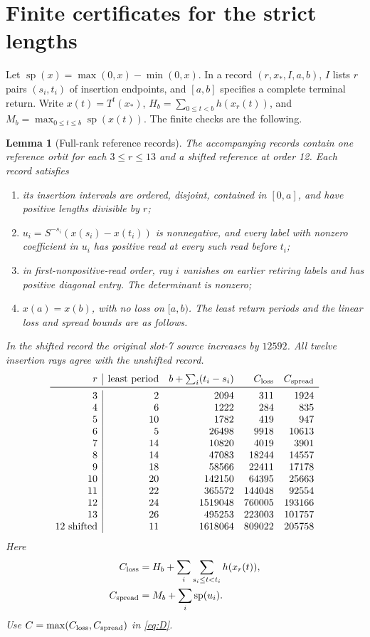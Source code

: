 \documentclass[11pt,reqno]{amsart}
\newtheorem{lemma}[theorem]{Lemma}
\theoremstyle{remark}
\begin{document}
\section{Finite certificates for the strict lengths}\label{app:strict}

Let \(\operatorname{sp}(x)=\max(0,x)-\min(0,x)\).
In a record \((r,x_*,I,a,b)\), \(I\) lists \(r\) pairs
\((s_i,t_i)\) of insertion endpoints, and \([a,b]\)
specifies a complete terminal return. Write \(x(t)=T^t(x_*)\),
\(H_b=\sum_{0\le t<b}h(x_r(t))\), and
\(M_b=\max_{0\le t\le b}\operatorname{sp}(x(t))\).
The finite checks are the following.

\begin{lemma}[Full-rank reference records]\label{lem:compstrict}
The accompanying records contain one reference orbit for each
\(3\le r\le13\) and a shifted reference at order 12.
Each record satisfies
\begin{enumerate}
\item its insertion intervals are ordered, disjoint, contained in
      \([0,a]\), and have positive lengths divisible by \(r\);
\item \(u_i=S^{-s_i}(x(s_i)-x(t_i))\) is nonnegative, and every label
      with nonzero coefficient in \(u_i\) has positive read at
      every such read before \(t_i\);
\item in first-nonpositive-read order, ray \(i\) vanishes on
      earlier retiring labels and has positive diagonal entry.
      The determinant is nonzero;
\item \(x(a)=x(b)\), with no loss on \([a,b)\).
      The least return periods and the linear loss and spread
      bounds are as follows.
\end{enumerate}
In the shifted record the original slot-7 source increases by
\(12592\). All twelve insertion rays agree with the unshifted record.
\[
\begin{array}{r|rrrr}
r & \text{least period} & b+\sum_i(t_i-s_i) & C_{\rm loss} & C_{\rm spread}\\
\midrule
3 & 2 &2094&311&1924\\
4 & 6 &1222&284&835\\
5 &10 &1782&419&947\\
6 & 5 &26498&9918&10613\\
7 &14 &10820&4019&3901\\
8 &14 &47083&18244&14557\\
9 &18 &58566&22411&17178\\
10&20 &142150&64395&25663\\
11&22 &365572&144048&92554\\
12&24 &1519048&760005&193166\\
13&26 &495253&223003&101757\\
12\text{ shifted}&11&1618064&809022&205758
\end{array}
\]
Here
\[
\begin{aligned}
 C_{\rm loss}
   &=H_b+\sum_i\sum_{s_i\le t<t_i}h(x_r(t)),\\
 C_{\rm spread}
   &=M_b+\sum_i\operatorname{sp}(u_i).
\end{aligned}
\]
Use \(C=\max(C_{\rm loss},C_{\rm spread})\) in \eqref{eq:D}.
\end{lemma}
\end{document}
